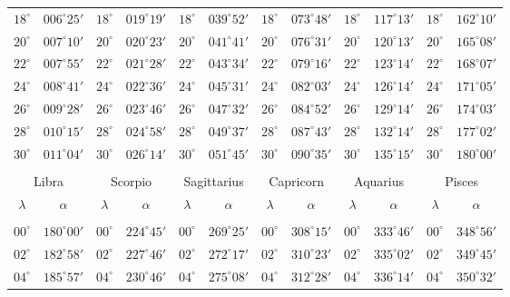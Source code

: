 \begin{table}[!h]
{\begin{tabular}{cc|cc|cc|cc|cc|cc}
$18^\circ$ & $006^\circ25'$ & $18^\circ$ & $019^\circ19'$ & $18^\circ$ & $039^\circ52'$ & $18^\circ$ & $073^\circ48'$ & $18^\circ$ & $117^\circ13'$ & $18^\circ$ & $162^\circ10'$\\
$20^\circ$ & $007^\circ10'$ & $20^\circ$ & $020^\circ23'$ & $20^\circ$ & $041^\circ41'$ & $20^\circ$ & $076^\circ31'$ & $20^\circ$ & $120^\circ13'$ & $20^\circ$ & $165^\circ08'$\\
$22^\circ$ & $007^\circ55'$ & $22^\circ$ & $021^\circ28'$ & $22^\circ$ & $043^\circ34'$ & $22^\circ$ & $079^\circ16'$ & $22^\circ$ & $123^\circ14'$ & $22^\circ$ & $168^\circ07'$\\
$24^\circ$ & $008^\circ41'$ & $24^\circ$ & $022^\circ36'$ & $24^\circ$ & $045^\circ31'$ & $24^\circ$ & $082^\circ03'$ & $24^\circ$ & $126^\circ14'$ & $24^\circ$ & $171^\circ05'$\\
$26^\circ$ & $009^\circ28'$ & $26^\circ$ & $023^\circ46'$ & $26^\circ$ & $047^\circ32'$ & $26^\circ$ & $084^\circ52'$ & $26^\circ$ & $129^\circ14'$ & $26^\circ$ & $174^\circ03'$\\
$28^\circ$ & $010^\circ15'$ & $28^\circ$ & $024^\circ58'$ & $28^\circ$ & $049^\circ37'$ & $28^\circ$ & $087^\circ43'$ & $28^\circ$ & $132^\circ14'$ & $28^\circ$ & $177^\circ02'$\\
$30^\circ$ & $011^\circ04'$ & $30^\circ$ & $026^\circ14'$ & $30^\circ$ & $051^\circ45'$ & $30^\circ$ & $090^\circ35'$ & $30^\circ$ & $135^\circ15'$ & $30^\circ$ & $180^\circ00'$\\
\multicolumn{12}{c}{}\\
\multicolumn{2}{c}{Libra}\vline & \multicolumn{2}{c}{Scorpio} \vline& \multicolumn{2}{c}{Sagittarius} \vline& \multicolumn{2}{c}{Capricorn}\vline &
\multicolumn{2}{c}{Aquarius}\vline & \multicolumn{2}{c}{Pisces}\\\hline
$\lambda$& $\alpha$& $\lambda$& $\alpha$& $\lambda$& $\alpha$& $\lambda$& $\alpha$& $\lambda$& $\alpha$& $\lambda$& $\alpha$\\\hline
&&&&&&&&&&&\\[-2ex]
$00^\circ$ & $180^\circ00'$ & $00^\circ$ & $224^\circ45'$ & $00^\circ$ & $269^\circ25'$ & $00^\circ$ & $308^\circ15'$ &  $00^\circ$ & $333^\circ46'$ & $00^\circ$ & $348^\circ56'$\\
$02^\circ$ & $182^\circ58'$ & $02^\circ$ & $227^\circ46'$ & $02^\circ$ & $272^\circ17'$ & $02^\circ$ & $310^\circ23'$ &  $02^\circ$ & $335^\circ02'$ & $02^\circ$ & $349^\circ45'$\\
$04^\circ$ & $185^\circ57'$ & $04^\circ$ & $230^\circ46'$ & $04^\circ$ & $275^\circ08'$ & $04^\circ$ & $312^\circ28'$ &  $04^\circ$ & $336^\circ14'$ & $04^\circ$ & $350^\circ32'$\\

\end{tabular}}
\end{table}
